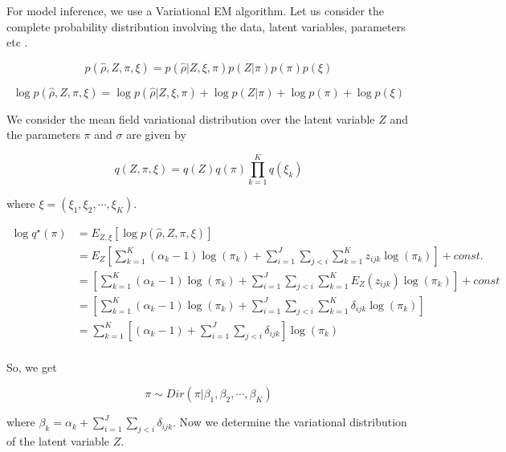 \documentclass[12pt]{article}
\begin{document}
For model inference, we use a Variational EM algorithm. Let us consider the complete probability distribution involving the data, latent variables, parameters etc .


$$  p (\hat{\rho}, Z, \pi, \xi ) = p (\hat{\rho} | Z, \xi, \pi) p (Z | \pi) p(\pi) p (\xi)  $$

$$  \log p (\hat{\rho}, Z, \pi, \xi ) = \log p (\hat{\rho} | Z, \xi, \pi) + \log p (Z | \pi) + \log p(\pi) + \log p(\xi) $$

We consider the mean field variational distribution over the latent variable $Z$ and the parameters $\pi$ and $\sigma$ are given by 

$$  q(Z, \pi, \xi) = q(Z) q(\pi) \prod_{k=1}^{K} q(\xi_{k})   $$

where $ \xi = \left (\xi_1, \xi_2, \cdots, \xi_K \right ) $.

\begin{align}
\log q^{\star} (\pi)  & = E_{Z, \xi} \left [   \log p (\hat{\rho}, Z, \pi, \xi ) \right ]   \\
			    & = E_{Z} \left [ \sum_{k=1}^{K} \left (\alpha_{k} - 1\right) \log (\pi_k) + \sum_{i=1}^{J} \sum_{j < i} \sum_{k=1}^{K} z_{ijk} \log (\pi_{k} ) \right ]  + const. \\
			    & =  \left [ \sum_{k=1}^{K} \left (\alpha_{k} - 1\right) \log (\pi_k) +  \sum_{i=1}^{J} \sum_{j < i}  \sum_{k=1}^{K} E_{Z} (z_{ijk}) \log (\pi_{k}) \right ] + const \\
			    & = \left [ \sum_{k=1}^{K} \left (\alpha_{k} - 1\right) \log (\pi_k) +  \sum_{i=1}^{J} \sum_{j < i} \sum_{k=1}^{K} \delta_{ijk} \log (\pi_{k}) \right ]  \\
			    & = \sum_{k=1}^{K} \left [   \left (\alpha_{k} - 1\right)  + \sum_{i=1}^{J} \sum_{j < i}  \delta_{ijk} \right]\log (\pi_{k})  \\
\end{align}


So, we get 

$$  \pi \sim Dir \left (   \pi | \beta_1, \beta_2, \cdots, \beta_{K} \right ) $$

where  $ \beta_{k} = \alpha_{k} + \sum_{i=1}^{J} \sum_{j < i} \delta_{ijk}$.  Now we determine the variational distribution of the latent variable $Z$. 
\end{document}
